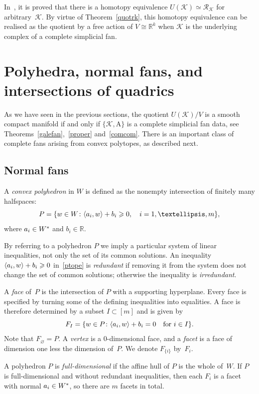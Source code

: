 \documentclass[a4paper]{amsart}
\theoremstyle{definition}
\theoremstyle{remark}
\numberwithin{equation}{section}
\def\R{\mathbb R}
\def\R{\mathbb R}
\def\sK{\mathcal K}
\newcommand{\mb}[1]{{\textbf {\textit#1}}}
\renewcommand{\ge}{\geqslant}
\def\rk{\mathcal R_{\mathcal K}}
\newcommand{\<}{\langle}
\renewcommand{\>}{\rangle}
\begin{document}
In~\cite[Theorem~4.7.5]{bu-pa15}, it is proved that there is a homotopy equivalence $U(\sK)\simeq\rk$ for arbitrary~$\sK$. By virtue of Theorem~\ref{quotrk}, this homotopy equivalence can be realised as the quotient by a free action of  $V\cong\R^k$ when $\sK$ is the underlying complex of a complete simplicial fan.



\section{Polyhedra, normal fans, and intersections of quadrics}\label{normsec}
As we have seen in the previous sections, the quotient $U(\sK)/V$ is a smooth compact manifold if and only if $\{\sK,\mathrm A\}$ is a complete simplicial fan data, see Theorems~\ref{galefan},~\ref{proper} and~\ref{comcom}. There is an important class of complete fans arising from convex polytopes, as described next.


\subsection{Normal fans}
A \emph{convex polyhedron} in $W$ is defined as the nonempty intersection of finitely many halfspaces:
\begin{equation}\label{ptope}
  P=\{\mb w\in W\colon\langle \mb a_i,\mb w\rangle+b_i\ge0,\quad i=1,\ldots,m\},
\end{equation}
where $\mb a_i\in W^*$ and $b_i\in\R$. 

By referring to a polyhedron $P$ we imply a particular system of linear inequalities, not only the set of its common solutions. An inequality $\langle\mb a_i,\mb w\rangle+b_i\ge0$ in~\eqref{ptope} is 
\emph{redundant} if removing it from the system does not change the set of common solutions; otherwise the inequality is \emph{irredundant}.

A \emph{face} of~$P$ is the intersection of $P$ with a supporting hyperplane. Every face is specified by turning some of the defining inequalities into equalities. A face is therefore determined by a subset $I\subset[m]$ and is given by
\[
  F_I=\{\mb w\in P\colon \langle\mb a_i,\mb w\rangle+b_i=0 \quad\text{for }i\in I\}.
\]
Note that $F_\varnothing=P$. A \emph{vertex} is a $0$-dimensional face, and a \emph{facet} is a face of dimension one less the dimension of~$P$. We denote $F_{\{i\}}$ by~$F_i$.

A polyhedron $P$ is \emph{full-dimensional} if the affine hull of $P$ is the whole of~$W$.
If $P$ is full-dimensional and without redundant inequalities, then each $F_{i}$ is a facet with normal $\mb a_i\in W^*$, so there are $m$ facets in total.
\end{document}
